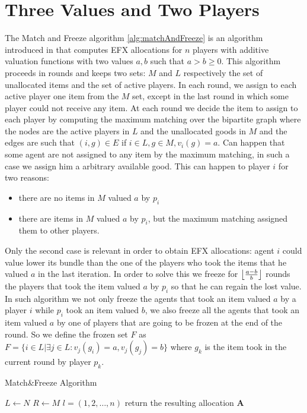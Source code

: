 \chapter{Three Values and Two Players}
The Match and Freeze algorithm \ref{alg:matchAndFreeze} is an algorithm introduced in \cite{DBLP:MaximumNashWelfareandOtherStoriesAboutEFX} that computes EFX allocations for $n$ players with additive valuation functions with two values $a, b$ such that $a>b\ge0$. This algorithm proceeds in rounds and keeps two sets: $M$ and $L$ respectively the set of unallocated items and the set of active players. In each round, we assign to each active player one item from the $M$ set, except in the last round in which some player could not receive any item. At each round we decide the item to assign to each player by computing the maximum matching over the bipartite graph where the nodes are the active players in $L$ and the unallocated goods in $M$ and the edges are such that $(i,g)\in E$ if $i\in L, g\in M, v_i(g) = a$. Can happen that some agent are not assigned to any item by the maximum matching, in such a case we assign him a arbitrary available good. This can happen to player $i$ for two reasons: 
\begin{itemize}
    \item there are no items in $M$ valued $a$ by $p_i$
    \item there are items in $M$ valued $a$ by $p_i$, but the maximum matching assigned them to other players.
\end{itemize}
Only the second case is relevant in order to obtain EFX allocations: agent $i$ could value lower its bundle than the one of the players who took the items that he valued $a$ in the last iteration. In order to solve this we freeze for $\left \lfloor\frac{a-b}{b}\right \rfloor$ rounds the players that took the item valued $a$ by $p_i$ so that he can regain the lost value. In such algorithm we not only freeze the agents that took an item valued $a$ by a player $i$ while $p_i$ took an item valued $b$, we also freeze all the agents that took an item valued $a$ by one of players that are going to be frozen at the end of the round. So we define the frozen set $F$ as $F=\{i\in L | \exists j\in L: v_j(g_i) = a, v_j(g_j) = b\}$ where $g_k$ is the item took in the current round by player $p_k$.
\begin{algorithm}
\caption{Match\&Freeze Algorithm}\label{alg:matchAndFreeze}
$L\gets N$\;
$R\gets M$\;
$l=(1,2,\dots, n)$
return the resulting allocation $\boldsymbol A$\;
\end{algorithm}


